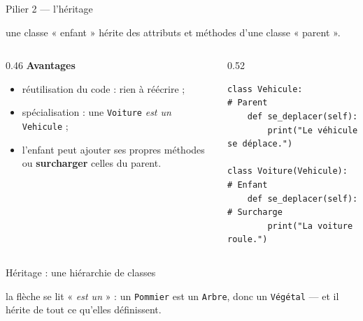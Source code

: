 \documentclass[11pt,aspectratio=169]{beamer}
\newcommand{\py}[1]{\texttt{#1}}
\begin{document}
\begin{frame}[fragile]{Pilier 2 --- l'héritage}
  \begin{defi}[Héritage]
    une classe « enfant » hérite des attributs et méthodes d'une classe « parent ».
  \end{defi}
  \begin{columns}[T,onlytextwidth]
    \begin{column}{0.46\textwidth}
      \textbf{Avantages}
      \begin{itemize}
        \item réutilisation du code : rien à réécrire ;
        \item spécialisation : une \py{Voiture} \emph{est un} \py{Vehicule} ;
        \item l'enfant peut ajouter ses propres méthodes ou \textbf{surcharger}
              celles du parent.
      \end{itemize}
    \end{column}
    \begin{column}{0.52\textwidth}
\begin{lstlisting}
class Vehicule:                 # Parent
    def se_deplacer(self):
        print("Le véhicule se déplace.")

class Voiture(Vehicule):        # Enfant
    def se_deplacer(self):      # Surcharge
        print("La voiture roule.")
\end{lstlisting}
    \end{column}
  \end{columns}
\end{frame}

\begin{frame}[shrink=8]{Héritage : une hiérarchie de classes}
  \begin{center}
  \end{center}
  \vspace{-2mm}
  \begin{methode}[Lecture]
    la flèche se lit « \emph{est un} » : un \py{Pommier} est un \py{Arbre}, donc un
    \py{Végétal} --- et il hérite de tout ce qu'elles définissent.
  \end{methode}
\end{frame}
\end{document}
